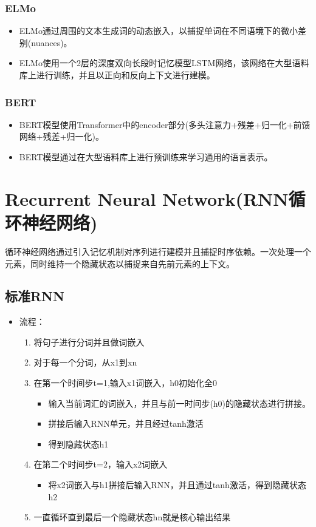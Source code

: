 \documentclass[UTF8]{ctexart}
\begin{document}
\subsubsection{ELMo}

\begin{itemize}
    \item ELMo通过周围的文本生成词的动态嵌入，以捕捉单词在不同语境下的微小差别(nuances)。
    \item ELMo使用一个2层的深度双向长段时记忆模型LSTM网络，该网络在大型语料库上进行训练，并且以正向和反向上下文进行建模。
\end{itemize}

\subsubsection{BERT}

\begin{itemize}
    \item BERT模型使用Transformer中的encoder部分(多头注意力+残差+归一化+前馈网络+残差+归一化)。
    \item BERT模型通过在大型语料库上进行预训练来学习通用的语言表示。
\end{itemize}

\section{Recurrent Neural Network(RNN循环神经网络)}

循环神经网络通过引入记忆机制对序列进行建模并且捕捉时序依赖。一次处理一个元素，同时维持一个隐藏状态以捕捉来自先前元素的上下文。

\subsection{标准RNN}

\begin{itemize}
    \item 流程：
    \begin{enumerate}
        \item 将句子进行分词并且做词嵌入
        \item 对于每一个分词，从x1到xn
        \item 在第一个时间步t=1,输入x1词嵌入，h0初始化全0
        \begin{itemize}
            \item 输入当前词汇的词嵌入，并且与前一时间步(h0)的隐藏状态进行拼接。
            \item 拼接后输入RNN单元，并且经过tanh激活
            \item 得到隐藏状态h1
        \end{itemize}
        \item 在第二个时间步t=2，输入x2词嵌入
        \begin{itemize}
            \item 将x2词嵌入与h1拼接后输入RNN，并且通过tanh激活，得到隐藏状态h2
        \end{itemize}
        \item 一直循环直到最后一个隐藏状态hn就是核心输出结果
    \end{enumerate}
\end{itemize}
\end{document}
